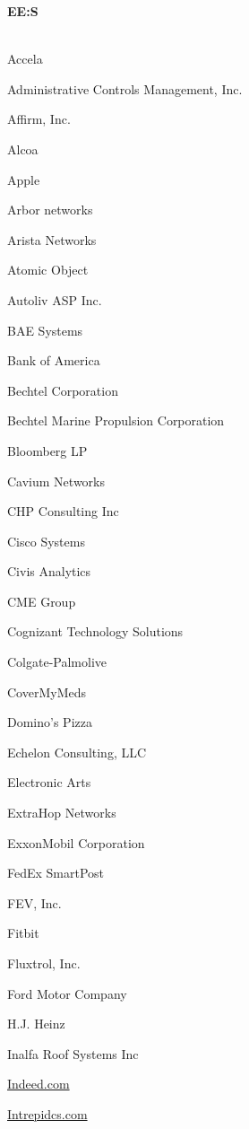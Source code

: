 \documentclass[twoside]{article}
\begin{document}
\begin{center}
\begin{multicols}{5}
        {\fontsize{14}{16}\selectfont \bf EE:S}\\
        \vspace{-1em}
        ~\hrulefill~
        \vspace{-.9em}
        \begin{FlushLeft}
        \begin{compactitem}
        \item Accela
\item Administrative Controls Management, Inc.
\item Affirm, Inc.
\item Alcoa
\item Apple
\item Arbor networks
\item Arista Networks
\item Atomic Object
\item Autoliv ASP Inc.
\item BAE Systems
\item Bank of America
\item Bechtel Corporation
\item Bechtel Marine Propulsion Corporation
\item Bloomberg LP
\item Cavium Networks
\item CHP Consulting Inc
\item Cisco Systems
\item Civis Analytics
\item CME Group
\item Cognizant Technology Solutions
\item Colgate-Palmolive
\item CoverMyMeds
\item Domino's Pizza
\item Echelon Consulting, LLC
\item Electronic Arts
\item ExtraHop Networks
\item ExxonMobil Corporation
\item FedEx SmartPost
\item FEV, Inc.
\item Fitbit
\item Fluxtrol, Inc.
\item Ford Motor Company
\item H.J. Heinz
\item Inalfa Roof Systems Inc
\item \url{Indeed.com}
\item \url{Intrepidcs.com}

\end{compactitem}
\end{FlushLeft}
\end{multicols}
\end{center}
\end{document}
